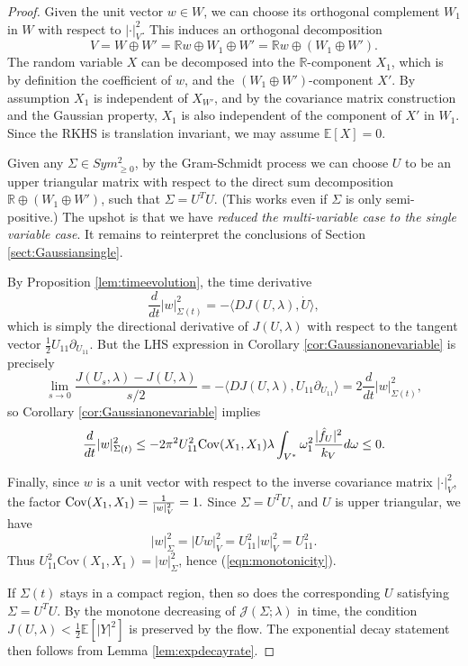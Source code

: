\documentclass[a4paper]{article}
\newcommand{\Cov}{{\rm Cov}}
\theoremstyle{definition}
\newcommand{\R}{\mathbb{R}}
\newcommand{\E}{\mathbb{E}}
\newcommand{\1}{\mathbbm{1}}
\begin{document}
	\begin{proof}
		Given the unit vector $w\in W$, we can choose its orthogonal complement $W_1$ in $W$ with respect to $|\cdot|_V^2$. This induces an orthogonal decomposition
		\[
		V=W\oplus W'= \R w\oplus W_1 \oplus W'= \R w\oplus  (W_1 \oplus W').
		\]
		The random variable $X$ can be decomposed into the $\R$-component $X_1$, which is by definition the coefficient of $w$, and the $(W_1 \oplus W')$-component $X'$. 
		By assumption $X_1$ is independent of $X_{W'}$, and by the covariance matrix construction and the Gaussian property, $X_1$ is also independent of the component of $X'$ in $W_1$. Since the RKHS is translation invariant, we may assume $\E[X]=0$.
		
		
		
		
		
		Given any $\Sigma\in Sym^2_{\geq 0}$, by the Gram-Schmidt process we can choose $U$ to be an upper triangular matrix with respect to the direct sum decomposition $\R\oplus  (W_1 \oplus W')$, such that $\Sigma=U^T U$. (This works even if $\Sigma$ is only semi-positive.) The upshot is that we have \emph{reduced the multi-variable case to the single variable case}. It remains to reinterpret the conclusions of Section \ref{sect:Gaussiansingle}.
		
		
		
		
		By Proposition \ref{lem:timeevolution}, the time derivative
		\[
		\frac{d}{dt}|w|_{\Sigma(t)}^2 =- \langle DJ(U,\lambda), \dot{U} \rangle,
		\]
		which is simply the directional derivative of $J(U,\lambda)$ with respect to the tangent vector $\frac{1}{2}U_{11}\partial_{U_{11}}$. %
		But the LHS expression in Corollary \ref{cor:Gaussianonevariable} is precisely
		\[
		\lim_{s\to 0} \frac{J(U_s, \lambda)-J(U,\lambda)}{s/2} = - \langle DJ(U,\lambda), U_{11}\partial_{U_{11}} \rangle= 2\frac{d}{dt}|w|_{\Sigma(t)}^2, 
		\]
		so Corollary \ref{cor:Gaussianonevariable} implies
		\[
		\frac{d}{dt}|w|_{\Sigma(t)}^2\leq -2\pi^2  U_{11}^2 \Cov(X_1,X_1)\lambda \int_{V^*} \omega_1^2  \frac{ |\hat{f}_U|^2}{k_V} d\omega\leq 0.
		\]
		
		
		
		Finally, since $w$ is a unit vector with respect to the inverse covariance matrix $|\cdot|_V^2$, the factor
		$
		\Cov(X_1, X_1)= \frac{1}{ |w|_V^2 }=1.$ Since $\Sigma = U^T U$, and $U$ is upper triangular, we have  
		\begin{equation*}
			|w|_\Sigma^2 = |Uw|_V^2 = U_{11}^2 |w|_V^2 = U_{11}^2. 
		\end{equation*}
		Thus $U_{11}^2 \text{Cov}(X_1,X_1)= |w|_\Sigma^2$, hence (\ref{eqn:monotonicity}).
		
		
		
		
		
		If $\Sigma(t)$ stays in a compact region, then so does the corresponding $U$ satisfying $\Sigma= U^T U$.  By the monotone decreasing of $\mathcal{J}(\Sigma;\lambda)$ in time, the condition $J(U,\lambda)<\frac{1}{2}\E[|Y|^2]$ is preserved by the flow. 
		The exponential decay statement then follows from Lemma \ref{lem:expdecayrate}.
	\end{proof}
	
\end{document}

